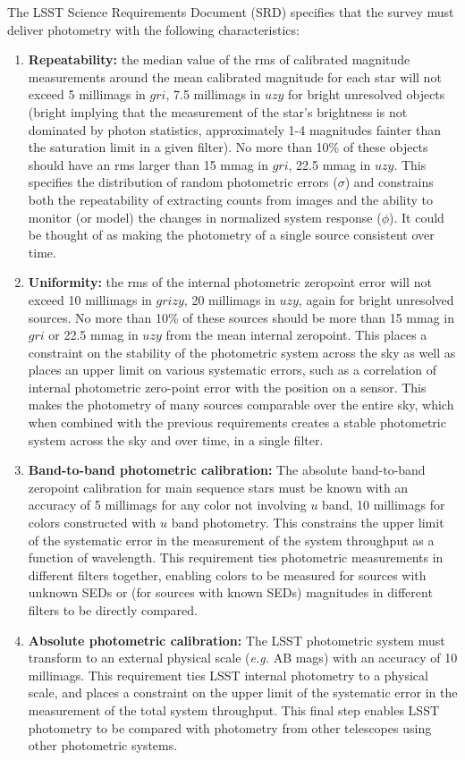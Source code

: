 \documentclass[12pt,preprint]{aastex}
\begin{document}
The LSST Science Requirements Document (SRD) specifies that the survey
must deliver photometry with the following characteristics: 
\begin{enumerate}
\item{{\bf Repeatability:} the median value of the rms of calibrated magnitude
measurements around the mean calibrated magnitude for each
star will not exceed 5 millimags in $gri$, 7.5 millimags in $uzy$
for bright unresolved objects (bright implying that the measurement
of the star's brightness is not dominated by photon statistics,
approximately 1-4 magnitudes fainter than the saturation limit in a
given filter).  No more than 10\% of these objects should have an rms larger
than 15 mmag in $gri$, 22.5 mmag in $uzy$.  This specifies the
distribution of random photometric errors ($\sigma$) and constrains
both the repeatability of extracting counts from images and the
ability to monitor (or model) the changes in normalized system
response ($\phi$). It could be thought of as making the photometry of
a single source consistent over time. \label{repeatability_req}}
\item{{\bf Uniformity:} the rms of the internal photometric zeropoint
error will not exceed 10 millimags in $grizy$, 20 millimags in $uzy$,
again for bright unresolved sources. No more than 10\% of these
sources should be more than 15 mmag in $gri$ or 22.5 mmag in $uzy$
from the mean internal zeropoint.  This places a constraint on the
stability of the photometric system across the sky as well as places
an upper limit on various systematic errors, such as a correlation of
internal photometric zero-point error with the position on a
sensor. This makes the photometry of many sources comparable over the
entire sky, which when combined with the previous requirements creates
a stable photometric system across the sky and over time, in a single
filter. \label{uniformity_req}}
\item{{\bf Band-to-band photometric calibration:} The absolute
band-to-band zeropoint calibration for main sequence stars must be
known with an accuracy of 5 millimags for any color not involving $u$
band, 10 millimags for colors constructed with $u$ band
photometry. This constrains the upper limit of the systematic error in
the measurement of the system throughput as a function of
wavelength. This requirement ties photometric measurements in
different filters together, enabling colors to be measured for sources
with unknown SEDs or (for sources with known SEDs) magnitudes in
different filters to be directly compared. \label{color_req}}
\item{{\bf Absolute photometric calibration:} The LSST photometric
system must transform to an external physical scale ({\it e.g.} AB
mags) with an accuracy of 10 millimags. This requirement ties LSST
internal photometry to a physical scale, and places a constraint on
the upper limit of the systematic error in the measurement of the
total system throughput. This final step enables LSST photometry to be
compared with photometry from other telescopes using other photometric
systems. \label{abs_req}}
\end{enumerate}
\end{document}
